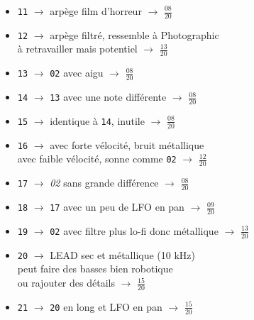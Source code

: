 \documentclass[a4paper, 13pt]{article}
\begin{document}
\begin{itemize}
    \item \texttt{11} $\rightarrow$ arpège film d'horreur $\rightarrow$ \Large{$\frac{08}{20}$} \normalsize \vspace{0.2cm}
    \item \texttt{12} $\rightarrow$ arpège filtré, ressemble à Photographic \\à retravailler mais potentiel $\rightarrow$ \Large{$\frac{13}{20}$} \normalsize \vspace{0.2cm}
    \item \texttt{13} $\rightarrow$ \texttt{02} avec aigu $\rightarrow$ \Large{$\frac{08}{20}$} \normalsize \vspace{0.2cm}
    \item \texttt{14} $\rightarrow$ \texttt{13} avec une note différente $\rightarrow$ \Large{$\frac{08}{20}$} \normalsize \vspace{0.2cm}
    \item \texttt{15} $\rightarrow$ identique à \texttt{14}, inutile $\rightarrow$ \Large{$\frac{08}{20}$} \normalsize \vspace{0.2cm}
    \item \texttt{16} $\rightarrow$ avec forte vélocité, bruit métallique \\ avec faible vélocité, sonne comme \texttt{02} $\rightarrow$ \Large{$\frac{12}{20}$} \normalsize \vspace{0.2cm}
    \item \texttt{17} $\rightarrow$ \textsl{02} sans grande différence $\rightarrow$ \Large{$\frac{08}{20}$} \normalsize \vspace{0.2cm}
    \item \texttt{18} $\rightarrow$ \texttt{17} avec un peu de LFO en pan $\rightarrow$ \Large{$\frac{09}{20}$} \normalsize \vspace{0.2cm}
    \item \texttt{19} $\rightarrow$ \texttt{02} avec filtre plus lo-fi donc métallique $\rightarrow$ \Large{$\frac{13}{20}$} \normalsize \vspace{0.2cm}
    \item \texttt{20} $\rightarrow$ LEAD sec et métallique (10 kHz) \\peut faire des basses bien robotique\\ou rajouter des détails $\rightarrow$ \Large{$\frac{15}{20}$} \normalsize \vspace{0.2cm}
    \item \texttt{21} $\rightarrow$ \texttt{20} en long et LFO en pan $\rightarrow$ \Large{$\frac{15}{20}$} \normalsize \vspace{0.2cm}

\end{itemize}
\end{document}
